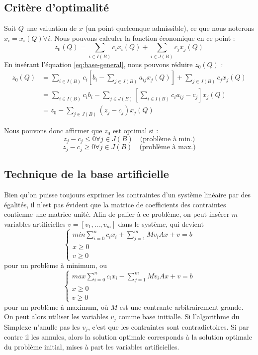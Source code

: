 \documentclass[a4paper]{report}
\theoremstyle{definition}
\theoremstyle{remark}
\theoremstyle{plain}
\begin{document}
\subsection{Critère d'optimalité}
Soit $Q$ une valuation de $x$ (un point quelconque admissible), ce que nous noterons $x_i = x_i(Q) \forall i$. Nous pouvons calculer la fonction économique en ce point :
\[z_0(Q) = \sum_{i \in I(B)}{c_i x_i(Q)} + \sum_{i \in J(B)}{c_j x_j(Q)} \]
En insérant l'équation \ref{eq:base-general}, nous pouvons réduire $z_0(Q)$ :
\begin{equation}\begin{split}
z_0(Q) & = \sum_{i \in I(B)}{c_i \left[ b_i - \sum_{j \in J(B)}{a_{ij}x_j(Q)} \right]} + \sum_{j \in J(B)}{c_j x_j(Q)} \\
& = \sum_{i \in I(B)}{c_i b_i - \sum_{j \in J(B)}{\left[ \sum_{i \in I(B)}{c_i a_{ij} - c_j} \right]} x_j(Q)} \\
& = z_0 - \sum_{j \in J(B)}{(z_j - c_j)x_j(Q)}
\end{split}\end{equation}

Nous pouvons donc affirmer que $z_0$ est optimal si :
\[z_j - c_j \leq 0 \forall j \in J(B) \quad \text{(problème à min.)}\]
\[z_j - c_j \geq 0 \forall j \in J(B) \quad \text{(problème à max.)}\]

\subsection{Technique de la base artificielle}
Bien qu'on puisse toujours exprimer les contraintes d'un système linéaire par
des égalités, il n'est pas évident que la matrice de coefficients des
contraintes contienne une matrice unité. Afin de palier à ce problème, on peut
insérer \(m\) variables artificielles \(v=[v_1,\dots,v_m]\) dans le système, qui
devient
\[\begin{cases}
	min \sum_{i=0}^{n}c_ix_i+\sum_{j=1}^{m}Mv_i
	Ax+v=b\\
	x\ge 0\\
	v\ge 0
\end{cases}\]
pour un problème à minimum, ou
\[\begin{cases}
	max \sum_{i=0}^{n}c_ix_i-\sum_{j=1}^{m}Mv_i
	Ax+v=b\\
	x\ge 0\\
	v\ge 0
\end{cases}\]
pour un problème à maximum, où \(M\) est une contrante arbitrairement grande. On
peut alors utiliser les variables \(v_j\) comme base initialle. Si l'algorithme
du Simplexe n'anulle pas les \(v_j\), c'est que les contraintes sont
contradictoires. Si par contre il les annules, alors la solution optimale
corresponds à la solution optimale du problème initial, mises à part les
variables artificielles.
\end{document}
